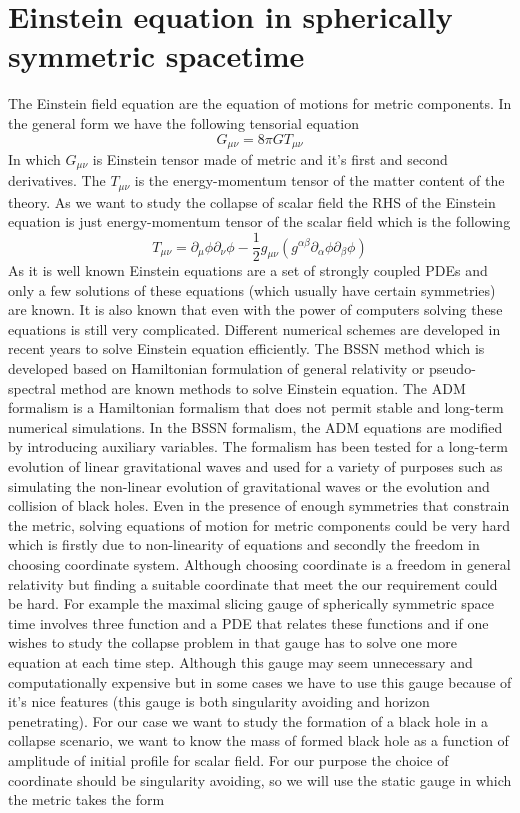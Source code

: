 \documentclass[a4paper,11pt]{article}
\begin{document}
\section{Einstein equation in spherically symmetric spacetime}
The Einstein field equation are the equation of motions for metric components. In the general form we have the following tensorial equation
\begin{equation}
	G_{\mu\nu}=8\pi G T_{\mu\nu}
\end{equation}
In which $G_{\mu\nu}$ is Einstein tensor made of metric and it's first and second derivatives. The $T_{\mu\nu}$ is the energy-momentum tensor of the matter content of the theory. As we want to study the collapse of scalar field the RHS of the Einstein equation is just energy-momentum tensor of the scalar field which is the following
\begin{equation}
	T_{\mu\nu}=\partial_\mu\phi\partial_\nu\phi-\frac{1}{2} g_{\mu\nu}(g^{\alpha\beta}\partial_\alpha\phi\partial_\beta\phi)
\end{equation}
As it is well known Einstein equations are a set of strongly coupled PDEs and only a few solutions of these equations (which usually have certain symmetries) are known. It is also known that even with the power of computers solving these equations is still very complicated. Different numerical schemes are developed in recent years to solve Einstein equation efficiently. The BSSN method which is developed based on Hamiltonian formulation of general relativity or pseudo-spectral method are known methods to solve Einstein equation. The ADM formalism is a Hamiltonian formalism that does not permit stable and long-term numerical simulations. In the BSSN formalism, the ADM equations are modified by introducing auxiliary variables. The formalism has been tested for a long-term evolution of linear gravitational waves and used for a variety of purposes such as simulating the non-linear evolution of gravitational waves or the evolution and collision of black holes. Even in the presence of enough symmetries that constrain the metric, solving equations of motion for metric components could be very hard which is firstly due to non-linearity of equations and secondly the freedom in choosing  coordinate system. Although choosing coordinate is a freedom in general relativity but finding a suitable coordinate that meet the our requirement could be hard. For example the maximal slicing gauge of spherically symmetric space time involves three function and a PDE that relates these functions and if one wishes to study the collapse problem in that gauge has to solve one more equation at each time step. Although this gauge may seem unnecessary and computationally expensive but in some cases we have to use this gauge because of it's nice features (this gauge is both singularity avoiding and horizon penetrating). For our case we want to study the formation of a black hole in a  collapse scenario, we want to know the mass of formed black hole as a function of amplitude of initial profile for scalar field. For our purpose the choice of coordinate should be singularity avoiding, so we will use the static gauge in which the metric takes the form
\end{document}
